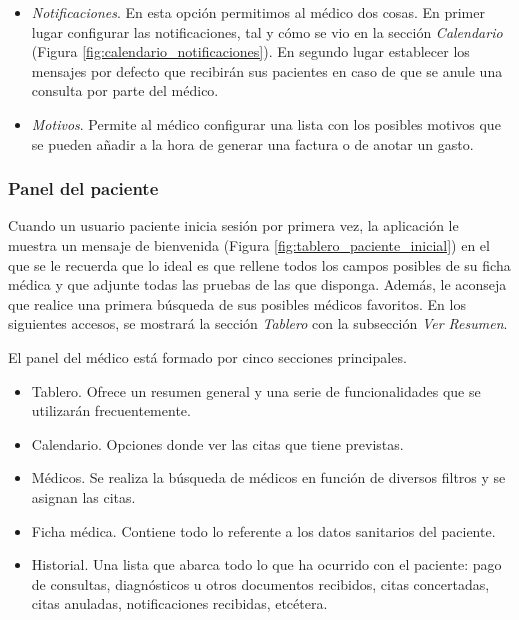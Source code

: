 \documentclass[a4paper,oneside,11pt]{book}
\begin{document}
\begin{itemize}
			\item \textit{Notificaciones}. En esta opción permitimos al médico dos cosas. En primer lugar configurar las notificaciones, tal y cómo se vio en la sección \textit{Calendario} (Figura \ref{fig:calendario_notificaciones}). En segundo lugar establecer los mensajes por defecto que recibirán sus pacientes en caso de que se anule una consulta por parte del médico.
			
			\item \textit{Motivos}. Permite al médico configurar una lista con los posibles motivos que se pueden añadir a la hora de generar una factura o de anotar un gasto.
			
		\end{itemize}
				
		
	
	\bigskip
	\subsubsection{Panel del paciente} %
		\label{sub:panel_paciente}
	
		Cuando un usuario paciente inicia sesión por primera vez, la aplicación le muestra un mensaje de bienvenida (Figura \ref{fig:tablero_paciente_inicial}) en el que se le recuerda que lo ideal es que rellene todos los campos posibles de su ficha médica y que adjunte todas las pruebas de las que disponga. Además, le aconseja que realice una primera búsqueda de sus posibles médicos favoritos. En los siguientes accesos, se mostrará la sección \textit{Tablero} con la subsección \textit{Ver Resumen}.		
	
		El panel del médico está formado por cinco secciones principales.
		\begin{itemize}
			\item Tablero. Ofrece un resumen general y una serie de funcionalidades que se utilizarán frecuentemente.
			\item Calendario. Opciones donde ver las citas que tiene previstas.
			\item Médicos. Se realiza la búsqueda de médicos en función de diversos filtros y se asignan las citas.
			\item Ficha médica. Contiene todo lo referente a los datos sanitarios del paciente.
			\item Historial. Una lista que abarca todo lo que ha ocurrido con el paciente: pago de consultas, diagnósticos u otros documentos recibidos, citas concertadas, citas anuladas, notificaciones recibidas, etcétera. 
		\end{itemize}
		
\end{document}
